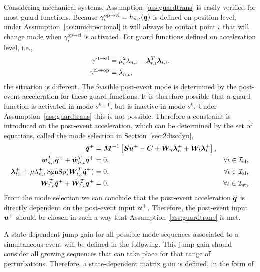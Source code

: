 \documentclass[../DC2017114Bouma.tex]{subfiles}
\begin{document}
\begin{sloppypar}
\begin{myremark}
Considering mechanical systems, Assumption~\ref{ass:guardtrans} is easily verified for most guard functions. Because $\gamma^{\text{op}\rightarrow\text{cl}}_{\iota} = h_{n,\iota}({\boldsymbol{q}})$ is defined on position level, under Assumption~\ref{ass:unidirectional} it will always be contact point $\iota$ that will change mode when $\gamma^{\text{op}\rightarrow\text{cl}}_{\iota}$ is activated. For guard functions defined on acceleration level, i.e.,
\begin{align*}
\gamma^{\textnormal{st}\rightarrow\textnormal{sl}} &= \mu_\iota^2\lambda_{n,\iota} - \boldsymbol{\lambda}^T_{t,\iota}\boldsymbol{\lambda}_{t,\iota},\\
\gamma^{\textnormal{cl}\rightarrow\textnormal{op}} &= \lambda_{n,\iota},
\end{align*}
the situation is different. The feasible post-event mode is determined by the post-event acceleration for these guard functions. It is therefore possible that a guard function is activated in mode $s^{k-1}$, but is inactive in mode $s^{k}$. Under Assumption~\ref{ass:guardtrans} this is not possible. Therefore a constraint is introduced on the post-event acceleration, which can be determined by the set of equations, called the mode selection in Section~\ref{sec:2discdyn},
\begin{align}
\ddot{{\boldsymbol{q}}}^+ &= {\boldsymbol{M}}^{-1}\left[{\boldsymbol{S}}{\boldsymbol{u}}^+ - {\boldsymbol{C}} + {\boldsymbol{W}}_{n}\boldsymbol{\lambda}^+_{n} + {\boldsymbol{W}}_{t}\boldsymbol{\lambda}^+_{t}\right], &  \nonumber\\
{\boldsymbol{w}}^T_{n,\iota}\ddot{{\boldsymbol{q}}}^+ + \dot{{\boldsymbol{w}}}^T_{n,\iota}\dot{{\boldsymbol{q}}}^+ &= 0, & \forall \iota\in\mathcal{I}_{\text{cl}},\nonumber\\
\boldsymbol{\lambda}^+_{t,\iota} + \mu\lambda^+_{n,\iota}\operatorname{\textnormal{SgnSp}}({\boldsymbol{W}}_{t,\iota}^T\dot{{\boldsymbol{q}}}^+) &= 0, & \forall \iota\in\mathcal{I}_{\text{sl}},\nonumber\\
{\boldsymbol{W}}^T_{t,\iota}\ddot{{\boldsymbol{q}}}^+ + \dot{{\boldsymbol{W}}}^T_{t,\iota}\dot{{\boldsymbol{q}}}^+ &= 0. & \forall \iota\in\mathcal{I}_{\text{st}},\nonumber
\end{align}
From the mode selection we can conclude that the post-event acceleration $\ddot{{\boldsymbol{q}}}$ is directly dependent on the post-event input ${\boldsymbol{u}}^+$. Therefore, the post-event input ${\boldsymbol{u}}^+$ should be chosen in such a way that Assumption~\ref{ass:guardtrans} is met.
\end{myremark}
\end{sloppypar}
A state-dependent jump gain for all possible mode sequences associated to a simultaneous event will be defined in the following. This jump gain should consider all growing sequences that can take place for that range of perturbations. Therefore, a state-dependent matrix gain is defined, in the form of
\end{document}
